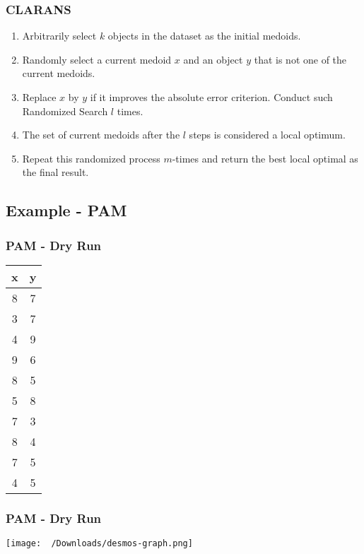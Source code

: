 \documentclass{beamer}
\begin{document}
\begin{frame}
    \frametitle{CLARANS}
    \begin{enumerate}
        \item Arbitrarily select $k$ objects in the dataset as the initial medoids.
        \item Randomly select a current medoid $x$ and an object $y$ that is not one of the current medoids.
        \item Replace $x$ by $y$ if it improves the absolute error criterion. Conduct such Randomized Search $l$ times.
        \item The set of current medoids after the $l$ steps is considered a local optimum.
        \item Repeat this randomized process $m$-times and return the best local optimal as the final result.
    \end{enumerate}       
\end{frame}

\subsection{Example - PAM}
\begin{frame}
    \frametitle{PAM - Dry Run}
    \begin{table}[h!]
        \centering
        \begin{tabular}{|c c|} 
             \hline
             x & y \\
             \hline
             8 & 7\\
             3 & 7\\
             4 & 9\\
             9 & 6\\
             8 & 5\\
             5 & 8\\
             7 & 3\\
             8 & 4\\
             7 & 5\\
             4 & 5\\
             \hline
        \end{tabular}
    \end{table}
\end{frame}

\begin{frame}
    \frametitle{PAM - Dry Run}
    \centering \texttt{[image: ~/Downloads/desmos-graph.png]}
\end{frame}
\end{document}
